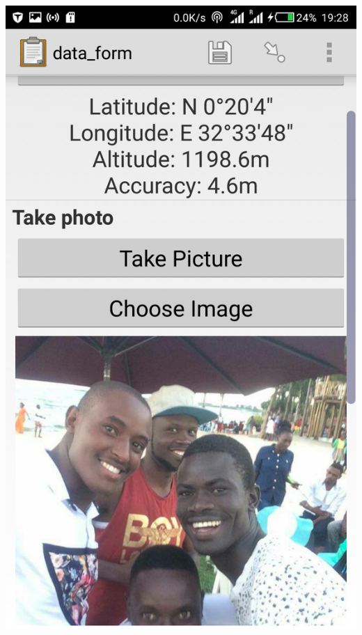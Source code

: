 \documentclass[12pt,letterpaper]{article}
\begin{document}
{							\includegraphics[scale=0.1]{paul5}
}
\end{document}
